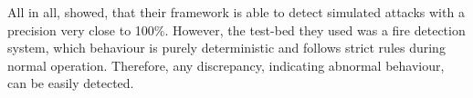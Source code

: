 All in all, \textcite{Pan2014} showed, that their framework is able to detect simulated attacks with a precision very close to 100\%. However, the test-bed they used was a fire detection system, which behaviour is purely deterministic and follows strict rules during normal operation.
Therefore, any discrepancy, indicating abnormal behaviour, can be easily detected.





